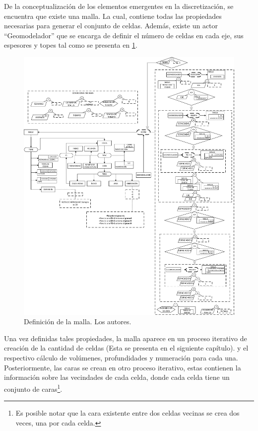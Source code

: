 De la conceptualización de los elementos emergentes en la discretización, se encuentra que existe una malla. La cual, contiene todas las propiedades necesarias para generar el conjunto de celdas. Además, existe un actor ``Geomodelador'' que se encarga de definir el número de celdas en cada eje, sus espesores y topes tal como se presenta en \ref{fig:Mesh}. \\
\begin{figure}[b]
	\centering%
	\includegraphics[width=0.9\linewidth]{Fig/Mesh.pdf}%
	\caption{Definición de la malla. Los autores.} \label{fig:Mesh}
\end{figure}

Una vez definidas tales propiedades, la malla aparece en un proceso iterativo de creación de la cantidad de celdas (Esta se presenta en el siguiente capítulo). y el respectivo cálculo de volúmenes, profundidades y numeración para cada una. Posteriormente, las caras se crean en otro proceso iterativo, estas contienen la información sobre las vecindades de cada celda, donde cada celda tiene un conjunto de caras\footnote{Es posible notar que la cara existente entre dos celdas vecinas se crea dos veces, una por cada celda.}. 

